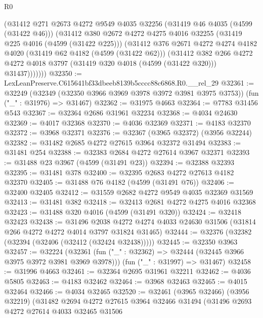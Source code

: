 \begin{lexlean}{R0}
\begin{coremodule}
          (@31412
            @271
            @2673
            @4272
            @9549
            @4035
            @32256
            (@31419 @46 @4035 (@4599 (@31422 @46)))
            (@31412
              @380
              @2672
              @4272
              @4275
              @4016
              @32255
              (@31419 @225 @4016 (@4599 (@31422 @225)))
              (@31412
                @376
                @2671
                @4272
                @4274
                @4182
                @4020
                (@31419 @62 @4182 (@4599 (@31422 @62)))
                (@31412
                  @382
                  @266
                  @4272
                  @4272
                  @4018
                  @3797
                  (@31419 @320 @4018 (@4599 (@31422 @320)))
                  @31437)))))))
@32350 := LexLeanPreserve.C615641bf33dbeeb8139b5cccc88c6868.R0.__rel_29
@32361 := @32249
    (@32349 (@32350 @3966 @3969 @3978 @3972 @3981 @3975 @3753))
    (fun ("_" : @31976) => @31467)
@32362 := @31975 @4663
@32364 := @7783 @31456 @543
@32367 := @32364 @2686 @31961 @32234
@32368 := @4034 @24630
@32369 := @4017 @32368
@32370 := @4036 @32369
@32371 := @4183 @32370
@32372 := @3968 @32371
@32376 := @32367 (@3965 @32372) (@3956 @32244)
@32382 := @31482 @2685 @4272 @27615 @3964 @32372 @31494
@32383 := @31481 @254
@32388 := @32383 @2684 @4272 @27614 @3967 @32371
@32393 := @31488 @23 @3967 (@4599 (@31491 @23))
@32394 := @32388 @32393
@32395 := @31481 @378
@32400 := @32395 @2683 @4272 @27613 @4182 @32370
@32405 := @31488 @76 @4182 (@4599 (@31491 @76))
@32406 := @32400 @32405
@32412 := @31559 @2682 @4272 @9549 @4035 @32369 @31569
@32413 := @31481 @382
@32418 := @32413 @2681 @4272 @4275 @4016 @32368
@32423 := @31488 @320 @4016 (@4599 (@31491 @320))
@32424 := @32418 @32423
@32438 := @31496
    @2038
    @4272
    @4274
    @4033
    @24630
    @31506
    (@31814 @266 @4272 @4272 @4014 @3797 @31824 @31465)
@32444 := @32376 (@32382 (@32394 (@32406 (@32412 (@32424 @32438)))))
@32445 := @32350 @3963
@32457 := @32224
    (@32361 (fun ("_" : @32362) => @32444 (@32445 @3966 @3975 @3972 @3981 @3969 @3978)))
    (fun ("_" : @31997) => @31467)
@32458 := @31996 @4663
@32461 := @32364 @2695 @31961 @32211
@32462 := @4036 @5805
@32463 := @4183 @32462
@32464 := @3968 @32463
@32465 := @4015 @32464
@32466 := @4034 @32465
@32520 := @32461
    (@3965 @32466)
    (@3956 @32219)
    (@31482
      @2694
      @4272
      @27615
      @3964
      @32466
      @31494
      (@31496
        @2693
        @4272
        @27614
        @4033
        @32465
        @31506

\end{coremodule}
\end{lexlean}
